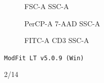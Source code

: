 \documentclass[UTF8,10pt,a4paper,fontset=fandol]{ctexart}
\newcommand{\handwritten}[1]{#1}
\begin{document}
\begin{figure}[ht]
\centering
\begin{minipage}[t]{0.30\linewidth}
\centering
{}

FSC-A \quad SSC-A
\end{minipage}
\hfill
\begin{minipage}[t]{0.30\linewidth}
\centering
{}

PerCP-A 7-AAD \quad SSC-A
\end{minipage}
\hfill
\begin{minipage}[t]{0.30\linewidth}
\centering
{}

FITC-A CD3 \quad SSC-A
\end{minipage}
\end{figure}

\noindent\texttt{ModFit LT v5.0.9 (Win)}

\handwritten{2/14}

\newpage
\end{document}
